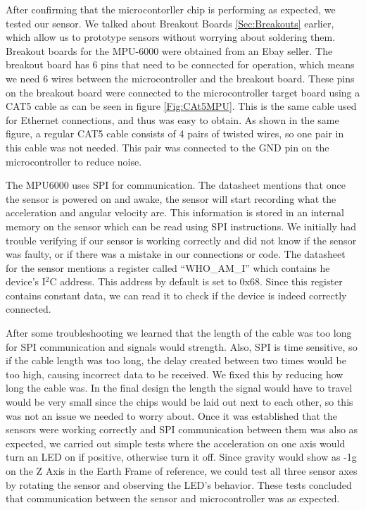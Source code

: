 After confirming that the microcontorller chip is performing as expected,
we tested our sensor. We talked about Breakout Boards \ref{Sec:Breakouts} earlier,
which allow us to prototype sensors without worrying about soldering them.
Breakout boards for the MPU-6000 were obtained from an Ebay seller.
The breakout board has 6 pins that need to be connected for operation,
which means we need 6 wires between the microcontroller and the breakout board.
These pins on the breakout board were connected to the microcontroller target board using a CAT5 cable as can be seen in figure \ref{Fig:CAt5MPU}.
This is the same cable used for Ethernet connections, and thus was easy to obtain.
As shown in the same figure,
a regular CAT5 cable consists of 4 pairs of twisted wires,
so one pair in this cable was not needed.
This pair was connected to the GND pin on the microcontroller to reduce noise.

The MPU6000 uses SPI for communication.
The datasheet mentions that once the sensor is powered on and awake,
the sensor will start recording what the acceleration and angular velocity are.
This information is stored in an internal memory on the sensor which can be read using SPI instructions.
We initially had trouble verifying if our sensor is working correctly and did not know if the sensor was faulty,
or if there was a mistake in our connections or code.
The datasheet for the sensor mentions a register called ``WHO\_AM\_I'' which contains he device's I$^2$C address.
This address by default is set to 0x68.
Since this register contains constant data, we can read it to check if the device is indeed correctly connected.

After some troubleshooting we learned that the length of the cable was too long for SPI communication and signals would strength.
Also, SPI is time sensitive, so if the cable length was too long,
the delay created between two times would be too high,
causing incorrect data to be received.
We fixed this by reducing how long the cable was.
In the final design the length the signal would have to travel would be very small since the chips would be laid out next to each other,
so this was not an issue we needed to worry about.
Once it was established that the sensors were working correctly and SPI communication between them was also as expected,
we carried out simple tests where the acceleration on one axis would turn an LED on if positive,
otherwise turn it off.
Since gravity would show as -1g on the Z Axis in the Earth Frame of reference,
we could test all three sensor axes by rotating the sensor and observing the LED's behavior.
These tests concluded that communication between the sensor and microcontroller was as expected.


